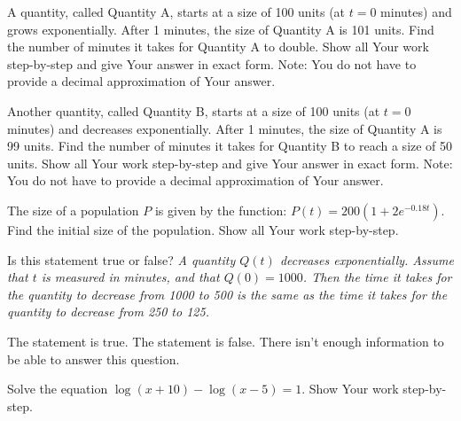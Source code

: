 \documentclass[11pt,answers]{exam}
\begin{document}
\begin{questions}


\addpoints



\question[2] A quantity, called Quantity A, starts at a size of 100 units (at $t=0$ minutes) and grows exponentially. After 1 minutes, the size of Quantity A is 101 units. Find the number of minutes it takes for Quantity A to double.    Show all Your work step-by-step and give Your answer in exact form. Note: You do not have to provide a decimal approximation of Your answer.


\fillwithdottedlines{3cm}

\question[2] Another quantity, called Quantity B, starts at a size of 100 units (at $t=0$ minutes) and decreases exponentially. After 1 minutes, the size of Quantity A is 99 units. Find the number of minutes it takes for Quantity B to reach a size of 50 units.     Show all Your work step-by-step and give Your answer in exact form. Note: You do not have to provide a decimal approximation of Your answer.

\fillwithdottedlines{3cm}

\question[2] The size of a population $P$ is given by the function: $\displaystyle P(t)=200(1+2e^{-0.18t})$. Find the initial size of the population. Show all Your work step-by-step.

\fillwithdottedlines{3cm}

\bonusquestion[1] Is this statement true or false? {\emph {A quantity $Q(t)$ decreases exponentially. Assume that $t$ is measured in minutes, and that $Q(0)=1000$. Then the time it takes for the quantity to decrease from 1000 to 500 is the same as the time it takes for the quantity to decrease from 250 to 125. }}

\begin{oneparchoices}
\choice The statement is true.
\choice The statement is false.
\choice There isn't enough information to be able to answer this question.
\end{oneparchoices}

\question[2] Solve the equation $\displaystyle \log(x+10)-\log(x-5)=1$. Show Your work step-by-step.

	\fillwithdottedlines{2cm}


\end{questions}
\end{document}
